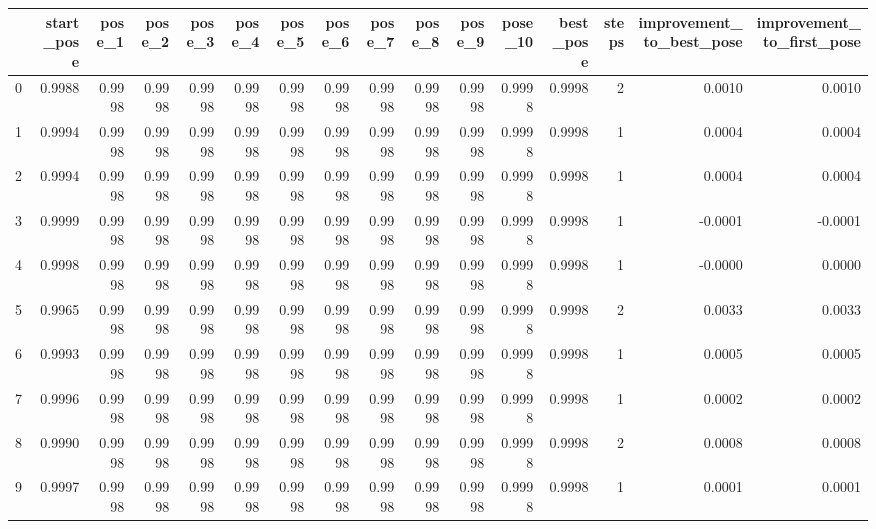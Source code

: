 \begin{tabular}{lrrrrrrrrrrrrrrr}
\toprule
{} &  start\_pose &  pose\_1 &  pose\_2 &  pose\_3 &  pose\_4 &  pose\_5 &  pose\_6 &  pose\_7 &  pose\_8 &  pose\_9 &  pose\_10 &  best\_pose &  steps &  improvement\_to\_best\_pose &  improvement\_to\_first\_pose \\
\midrule
0   &      0.9988 &  0.9998 &  0.9998 &  0.9998 &  0.9998 &  0.9998 &  0.9998 &  0.9998 &  0.9998 &  0.9998 &   0.9998 &     0.9998 &      2 &                    0.0010 &                     0.0010 \\
1   &      0.9994 &  0.9998 &  0.9998 &  0.9998 &  0.9998 &  0.9998 &  0.9998 &  0.9998 &  0.9998 &  0.9998 &   0.9998 &     0.9998 &      1 &                    0.0004 &                     0.0004 \\
2   &      0.9994 &  0.9998 &  0.9998 &  0.9998 &  0.9998 &  0.9998 &  0.9998 &  0.9998 &  0.9998 &  0.9998 &   0.9998 &     0.9998 &      1 &                    0.0004 &                     0.0004 \\
3   &      0.9999 &  0.9998 &  0.9998 &  0.9998 &  0.9998 &  0.9998 &  0.9998 &  0.9998 &  0.9998 &  0.9998 &   0.9998 &     0.9998 &      1 &                   -0.0001 &                    -0.0001 \\
4   &      0.9998 &  0.9998 &  0.9998 &  0.9998 &  0.9998 &  0.9998 &  0.9998 &  0.9998 &  0.9998 &  0.9998 &   0.9998 &     0.9998 &      1 &                   -0.0000 &                     0.0000 \\
5   &      0.9965 &  0.9998 &  0.9998 &  0.9998 &  0.9998 &  0.9998 &  0.9998 &  0.9998 &  0.9998 &  0.9998 &   0.9998 &     0.9998 &      2 &                    0.0033 &                     0.0033 \\
6   &      0.9993 &  0.9998 &  0.9998 &  0.9998 &  0.9998 &  0.9998 &  0.9998 &  0.9998 &  0.9998 &  0.9998 &   0.9998 &     0.9998 &      1 &                    0.0005 &                     0.0005 \\
7   &      0.9996 &  0.9998 &  0.9998 &  0.9998 &  0.9998 &  0.9998 &  0.9998 &  0.9998 &  0.9998 &  0.9998 &   0.9998 &     0.9998 &      1 &                    0.0002 &                     0.0002 \\
8   &      0.9990 &  0.9998 &  0.9998 &  0.9998 &  0.9998 &  0.9998 &  0.9998 &  0.9998 &  0.9998 &  0.9998 &   0.9998 &     0.9998 &      2 &                    0.0008 &                     0.0008 \\
9   &      0.9997 &  0.9998 &  0.9998 &  0.9998 &  0.9998 &  0.9998 &  0.9998 &  0.9998 &  0.9998 &  0.9998 &   0.9998 &     0.9998 &      1 &                    0.0001 &                     0.0001 \\

\end{tabular}
